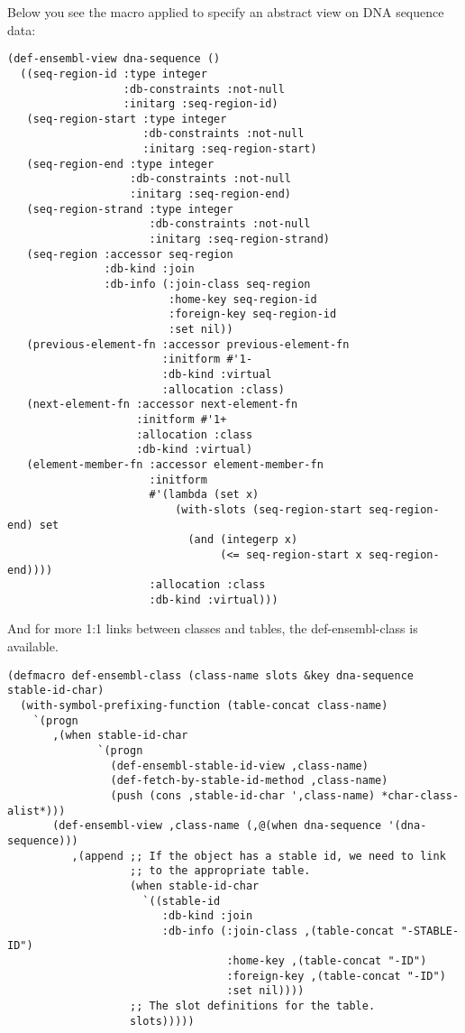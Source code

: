 \documentclass{book}
\begin{document}
Below you see the macro applied to specify an abstract view on DNA sequence data:
\begin{lstlisting}
(def-ensembl-view dna-sequence ()
  ((seq-region-id :type integer
                  :db-constraints :not-null
                  :initarg :seq-region-id)
   (seq-region-start :type integer
                     :db-constraints :not-null
                     :initarg :seq-region-start)
   (seq-region-end :type integer
                   :db-constraints :not-null
                   :initarg :seq-region-end)
   (seq-region-strand :type integer
                      :db-constraints :not-null
                      :initarg :seq-region-strand)
   (seq-region :accessor seq-region
               :db-kind :join
               :db-info (:join-class seq-region
                         :home-key seq-region-id
                         :foreign-key seq-region-id
                         :set nil))
   (previous-element-fn :accessor previous-element-fn
                        :initform #'1-
                        :db-kind :virtual
                        :allocation :class)
   (next-element-fn :accessor next-element-fn
                    :initform #'1+
                    :allocation :class
                    :db-kind :virtual)
   (element-member-fn :accessor element-member-fn
                      :initform
                      #'(lambda (set x)
                          (with-slots (seq-region-start seq-region-end) set
                            (and (integerp x)
                                 (<= seq-region-start x seq-region-end))))
                      :allocation :class
                      :db-kind :virtual)))
\end{lstlisting}

And for more 1:1 links between classes and tables, the def-ensembl-class is available.

\begin{lstlisting}
(defmacro def-ensembl-class (class-name slots &key dna-sequence stable-id-char)
  (with-symbol-prefixing-function (table-concat class-name)
    `(progn
       ,(when stable-id-char
              `(progn
                (def-ensembl-stable-id-view ,class-name)
                (def-fetch-by-stable-id-method ,class-name)
                (push (cons ,stable-id-char ',class-name) *char-class-alist*)))
       (def-ensembl-view ,class-name (,@(when dna-sequence '(dna-sequence)))
          ,(append ;; If the object has a stable id, we need to link
                   ;; to the appropriate table.
                   (when stable-id-char
                     `((stable-id
                        :db-kind :join
                        :db-info (:join-class ,(table-concat "-STABLE-ID")
                                  :home-key ,(table-concat "-ID")
                                  :foreign-key ,(table-concat "-ID")
                                  :set nil))))
                   ;; The slot definitions for the table.
                   slots)))))
\end{lstlisting}
\end{document}
